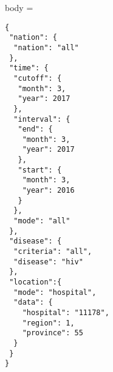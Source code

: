 \begin{multicols}{2}
body = 
\begin{verbatim}
{
 "nation": {
  "nation": "all"
 },
 "time": {
  "cutoff": {
   "month": 3,
   "year": 2017
  },
  "interval": {
   "end": {
    "month": 3,
    "year": 2017
   },
   "start": {
    "month": 3,
    "year": 2016
   }
  },
  "mode": "all"
 },
 "disease": {
  "criteria": "all",
  "disease": "hiv"
 },
 "location":{
  "mode": "hospital",
  "data": {
  	"hospital": "11178",
  	"region": 1,
  	"province": 55
  }
 }
}
\end{verbatim}
\end{multicols}